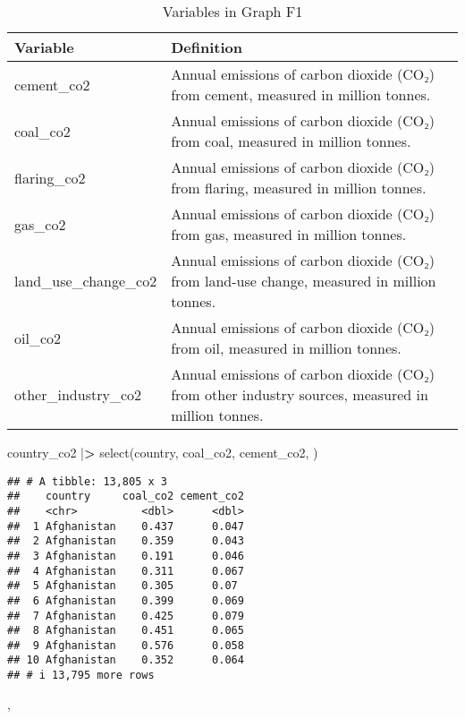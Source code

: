 \documentclass[
]{article}
\newenvironment{Shaded}{\begin{snugshade}}{\end{snugshade}}
\newcommand{\ErrorTok}[1]{\textcolor[rgb]{0.64,0.00,0.00}{\textbf{#1}}}
\newcommand{\FunctionTok}[1]{\textcolor[rgb]{0.00,0.00,0.00}{#1}}
\newcommand{\NormalTok}[1]{#1}
\newcommand{\SpecialCharTok}[1]{\textcolor[rgb]{0.00,0.00,0.00}{#1}}
\begin{document}
\begin{table}

\caption{\label{tab:unnamed-chunk-5}Variables in Graph F1}
\centering
\begin{tabular}[t]{l|l}
\hline
Variable & Definition\\
\hline
cement\_co2 & Annual emissions of carbon dioxide (CO₂) from cement, measured in million tonnes.\\
\hline
coal\_co2 & Annual emissions of carbon dioxide (CO₂) from coal, measured in million tonnes.\\
\hline
flaring\_co2 & Annual emissions of carbon dioxide (CO₂) from flaring, measured in million tonnes.\\
\hline
gas\_co2 & Annual emissions of carbon dioxide (CO₂) from gas, measured in million tonnes.\\
\hline
land\_use\_change\_co2 & Annual emissions of carbon dioxide (CO₂) from land-use change, measured in million tonnes.\\
\hline
oil\_co2 & Annual emissions of carbon dioxide (CO₂) from oil, measured in million tonnes.\\
\hline
other\_industry\_co2 & Annual emissions of carbon dioxide (CO₂) from other industry sources, measured in million tonnes.\\
\hline
\end{tabular}
\end{table}

\begin{Shaded}
\begin{Highlighting}[]
\NormalTok{country\_co2 }\SpecialCharTok{|}\ErrorTok{\textgreater{}}
  \FunctionTok{select}\NormalTok{(country, coal\_co2, cement\_co2, )}
\end{Highlighting}
\end{Shaded}

\begin{verbatim}
## # A tibble: 13,805 x 3
##    country     coal_co2 cement_co2
##    <chr>          <dbl>      <dbl>
##  1 Afghanistan    0.437      0.047
##  2 Afghanistan    0.359      0.043
##  3 Afghanistan    0.191      0.046
##  4 Afghanistan    0.311      0.067
##  5 Afghanistan    0.305      0.07 
##  6 Afghanistan    0.399      0.069
##  7 Afghanistan    0.425      0.079
##  8 Afghanistan    0.451      0.065
##  9 Afghanistan    0.576      0.058
## 10 Afghanistan    0.352      0.064
## # i 13,795 more rows
\end{verbatim}

,
\end{document}
